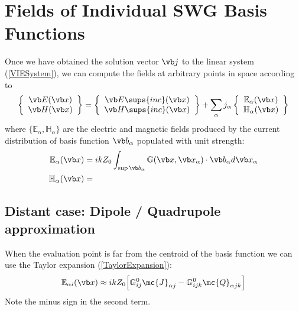 \documentclass[letterpaper]{article}
\begin{document}
\newpage
\section{Fields of Individual SWG Basis Functions}

Once we have obtained the solution vector $\vb j$ to the 
linear system (\ref{VIESystem}), we can compute the fields
at arbitrary points in space according to 
$$ \left\{ \begin{array}{c} \vb E(\vb x) \\ 
                            \vb H(\vb x) 
           \end{array} 
   \right\}
   = 
   \left\{ \begin{array}{c} \vb E\sups{inc}(\vb x) \\ 
                            \vb H\sups{inc}(\vb x) 
           \end{array} 
   \right\}
  + 
  \sum_\alpha j_\alpha
   \left\{ \begin{array}{c} \mathbb{E}_\alpha(\vb x) \\ 
                            \mathbb{H}_\alpha(\vb x)
           \end{array} 
   \right\}
$$
where $\{\mathbb{E}_\alpha, \mathbb{H}_\alpha\}$ are the
electric and magnetic fields produced by the current distribution
of basis function $\vb b_\alpha$ populated with unit strength:
\begin{align*}
 \mathbb{E}_\alpha(\vb x)
&= ikZ_0 
   \int_{\sup \vb b_\alpha} \mathbb{G}(\vb x, \vb x_\alpha) \cdot \vb b_\alpha
   d\vb x_\alpha
\\
 \mathbb{H}_\alpha(\vb x)
&= 
\end{align*}

\subsection*{Distant case: Dipole / Quadrupole approximation}

When the evaluation point is far from the centroid of the basis
function we can use the Taylor expansion (\ref{TaylorExpansion}):
$$
 \mathbb{E}_{\alpha i}(\vb x)
 \approx
 ikZ_0 \Big[   \mathbb{G}^0_{ij} \mc{J}_{\alpha j} 
             - \mathbb{G}^0_{ijk} \mc{Q}_{\alpha jk}
       \Big]
$$
Note the minus sign in the second term.
\end{document}
